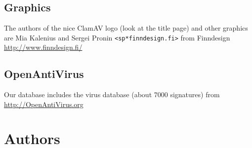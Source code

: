\documentclass[a4paper,titlepage,12pt]{article}
\newcommand{\email}[1]{\texttt{#1}}
\begin{document}
    \subsection{Graphics}
    The authors of the nice ClamAV logo (look at the title page) and other
    graphics are Mia Kalenius and Sergei Pronin \email{<sp*finndesign.fi>}
    from Finndesign \url{http://www.finndesign.fi/}

    \subsection{OpenAntiVirus}
    Our database includes the virus database (about 7000 signatures) from\\
    \url{http://OpenAntiVirus.org}

    \section{Authors}
\end{document}
